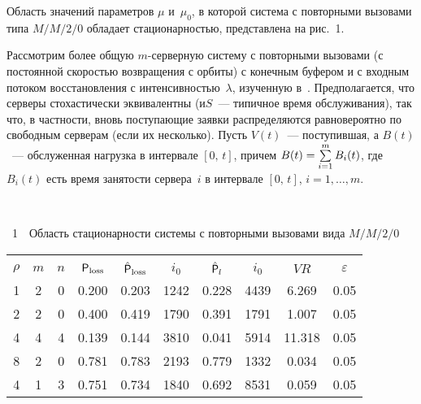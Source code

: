 \begin{multicols}{2}
Область значений параметров $\mu$ и~$\mu_0$,  в которой сис\-те\-ма с
повторными вызовами типа  $M/M/2/0$ обладает стационарностью, представлена на рис.~1.


Рассмотрим  более общую  $m$-сер\-вер\-ную сис\-те\-му с повторными вызовами
(с постоянной ско\-ростью возвращения с орбиты) с конечным буфером  и
с входным потоком восстановления с интенсив\-ностью~$\lambda$,
изученную в~\cite{Avr}.  Предполагается, что
  серверы стохастически
эквивалентны (и\linebreak $S$~--- ти\-пич\-ное  время обслуживания), так что, в
частности, вновь поступающие заявки распределяются  равновероятно по
свободным серверам (если их несколько).  Пусть $V(t)$~--- поступившая,
 а  $B(t)$~--- обслуженная нагрузка  в интервале $[0,\,t]$, причем
$B(t)\hm=\sum\limits_{i=1}^mB_i(t)$, где $B_i(t)$ есть время занятости сервера~$i$ 
в интервале $[0,\,t]$, $i=1,\ldots,m$. \linebreak\vspace*{-12pt}
\vspace*{2pt}
\begin{center}  %
 \mbox{%
 \epsfxsize=77.686mm
 }
 \end{center}
{{\figurename~1}\ \ \small{Область  стационарности  системы с повторными
вызовами вида  $M/M/2/0$}}




\vspace*{12pt}

\addtocounter{figure}{1}


\begin{table*}[b]\small
\vspace*{-12pt}
\begin{center} 
\vspace*{2ex}

\begin{tabular}{|c|c|c|c|c|c|c|c|c|c|} 
\hline
&&&&&&&&&\\[-9pt]
 $\rho$ & $m$   &$n$   &  ${\sf P}_{\mathrm{loss}}$ & $\hat{{\sf P}}_{\mathrm{loss}}$ &  $i_0$  &
 $\hat{{\sf P}}_l$  &  $i_0$& $VR$& $\varepsilon$ \\
 \hline
1& 2& 0& 0.200& 0.203& 1242& 0.228& 4439& 6.269& 0.05\\ 
2& 2& 0& 0.400& 0.419&1790& 0.391& 1791& 1.007& 0.05\\ 
4& 4& 4& 0.139 & 0.144& 3810& 0.041& 5914&11.318& 0.05\\
8& 2& 0& 0.781& 0.783& 2193& 0.779& 1332& 0.034& 0.05\\
4& 1& 3& 0.751& 0.734& 1840& 0.692& 8531& 0.059& 0.05\\
 \hline 
 \end{tabular} 
 \end{center} 
 \end{table*}


\end{multicols}
